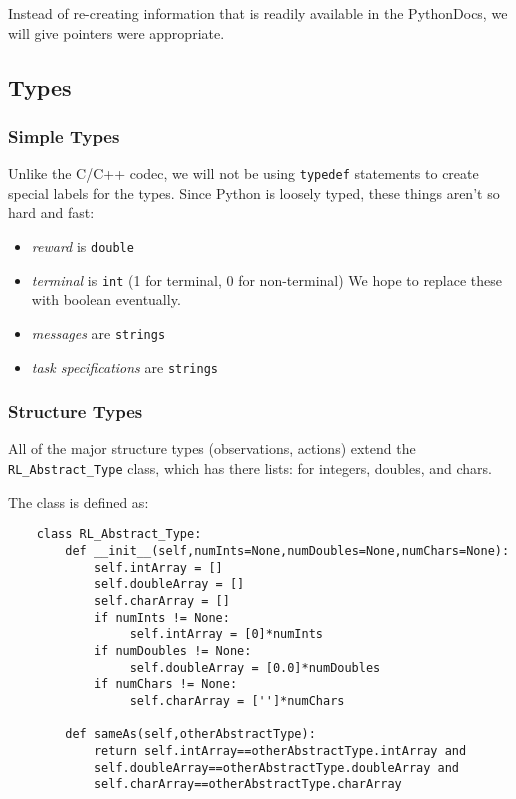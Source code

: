 \documentclass[11pt]{article}
\begin{document}
Instead of re-creating information that is readily available in the PythonDocs, we will give pointers were appropriate.

\subsection{Types}


\subsubsection{Simple Types}
Unlike the C/C++ codec, we will not be using \texttt{typedef} statements to create special labels for the types. Since Python is loosely typed, these things aren't so hard and 
fast:
\begin{itemize}
	\item \textit{reward} is \texttt{double}
	\item \textit{terminal} is \texttt{int} (1 for terminal, 0 for non-terminal) We hope to replace these with boolean eventually.
	\item \textit{messages} are \texttt{strings}
	\item \textit{task specifications} are \texttt{strings}
\end{itemize}

\def\rat{RL\_Abstract\_Type}

\subsubsection{Structure Types}
\label{sec:structure-types}
All of the major structure types (observations, actions) extend the \texttt{\rat} class, which has there lists: for integers, doubles, and chars.

The class is defined as:
\begin{verbatim}
    class RL_Abstract_Type:
        def __init__(self,numInts=None,numDoubles=None,numChars=None):
            self.intArray = []
            self.doubleArray = []
            self.charArray = []
            if numInts != None:
                 self.intArray = [0]*numInts
            if numDoubles != None:
                 self.doubleArray = [0.0]*numDoubles
            if numChars != None:
                 self.charArray = ['']*numChars

        def sameAs(self,otherAbstractType):
            return self.intArray==otherAbstractType.intArray and
            self.doubleArray==otherAbstractType.doubleArray and 
            self.charArray==otherAbstractType.charArray
\end{verbatim}
\end{document}
